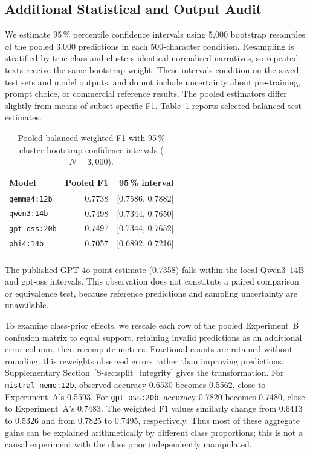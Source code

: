 \subsection{Additional Statistical and Output Audit}
\label{sec:audit}

We estimate 95\,\% percentile confidence intervals using 5,000
bootstrap resamples of the pooled 3,000 predictions in each
500-character condition. Resampling is stratified by true class and
clusters identical normalised narratives, so repeated texts receive
the same bootstrap weight. These intervals condition on the saved
test sets and model outputs, and do not include uncertainty about
pre-training, prompt choice, or commercial reference results. The
pooled estimators differ slightly from means of subset-specific F1.
Table~\ref{tab:bootstrap} reports selected balanced-test estimates.

\begin{table}[tb]
\centering
\caption{Pooled balanced weighted F1 with 95\,\% cluster-bootstrap
         confidence intervals ($N=3{,}000$).}
\label{tab:bootstrap}
\begin{tabular}{lrr}
\toprule
Model & Pooled F1 & 95\,\% interval \\
\midrule
\texttt{gemma4:12b} & 0.7738 & [0.7586, 0.7882] \\
\texttt{qwen3:14b} & 0.7498 & [0.7344, 0.7650] \\
\texttt{gpt-oss:20b} & 0.7497 & [0.7344, 0.7652] \\
\texttt{phi4:14b} & 0.7057 & [0.6892, 0.7216] \\
\botrule
\end{tabular}
\end{table}

The published GPT-4o point estimate (0.7358) falls within the local
Qwen3~14B and gpt-oss intervals. This observation does not constitute
a paired comparison or equivalence test, because reference predictions
and sampling uncertainty are unavailable.

To examine class-prior effects, we rescale each row of the pooled
Experiment~B confusion matrix to equal support, retaining invalid
predictions as an additional error column, then recompute metrics.
Fractional counts are retained without rounding; this reweights observed
errors rather than improving predictions. Supplementary
Section~\ref{S-sec:split_integrity} gives the transformation.
For \texttt{mistral-nemo:12b}, observed accuracy 0.6530 becomes 0.5562,
close to Experiment~A's 0.5593. For \texttt{gpt-oss:20b}, accuracy
0.7820 becomes 0.7480, close to Experiment~A's 0.7483.
The weighted F1 values similarly change from 0.6413 to 0.5326 and
from 0.7825 to 0.7495, respectively. Thus most of these aggregate
gains can be explained arithmetically by different class proportions;
this is not a causal experiment with the class prior independently manipulated.

